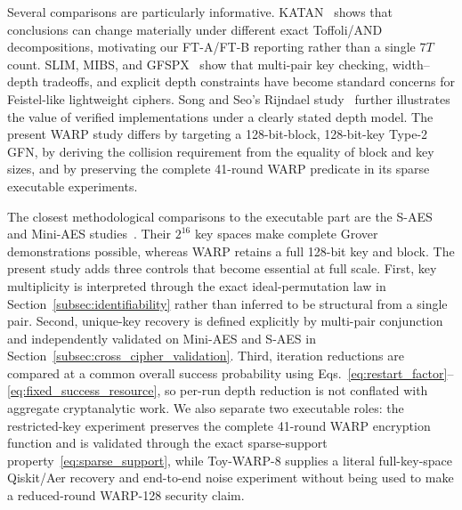 \documentclass[pdflatex,sn-nature]{sn-jnl}
\theoremstyle{thmstyleone}
\theoremstyle{thmstyletwo}
\begin{document}
Several comparisons are particularly informative. KATAN~\cite{Rahman2022} shows that conclusions can change materially under different exact Toffoli/AND decompositions, motivating our FT-A/FT-B reporting rather than a single $7T$ count. SLIM, MIBS, and GFSPX~\cite{SLIM2025,MIBS2026,Ulgen2026} show that multi-pair key checking, width--depth tradeoffs, and explicit depth constraints have become standard concerns for Feistel-like lightweight ciphers. Song and Seo's Rijndael study~\cite{SongSeo2026} further illustrates the value of verified implementations under a clearly stated depth model. The present WARP study differs by targeting a 128-bit-block, 128-bit-key Type-2 GFN, by deriving the collision requirement from the equality of block and key sizes, and by preserving the complete 41-round WARP predicate in its sparse executable experiments.

The closest methodological comparisons to the executable part are the S-AES and Mini-AES studies~\cite{Wang2025,Kiran2026}.  Their $2^{16}$ key spaces make complete Grover demonstrations possible, whereas WARP retains a full 128-bit key and block.  The present study adds three controls that become essential at full scale.  First, key multiplicity is interpreted through the exact ideal-permutation law in Section~\ref{subsec:identifiability} rather than inferred to be structural from a single pair.  Second, unique-key recovery is defined explicitly by multi-pair conjunction and independently validated on Mini-AES and S-AES in Section~\ref{subsec:cross_cipher_validation}.  Third, iteration reductions are compared at a common overall success probability using Eqs.~\eqref{eq:restart_factor}--\eqref{eq:fixed_success_resource}, so per-run depth reduction is not conflated with aggregate cryptanalytic work.  We also separate two executable roles: the restricted-key experiment preserves the complete 41-round WARP encryption function and is validated through the exact sparse-support property~\eqref{eq:sparse_support}, while Toy-WARP-8 supplies a literal full-key-space Qiskit/Aer recovery and end-to-end noise experiment without being used to make a reduced-round WARP-128 security claim.
\end{document}
